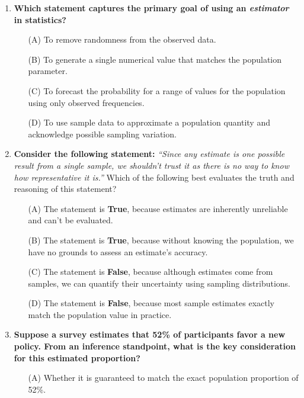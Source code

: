 \documentclass{article}
\begin{document}
\begin{enumerate}
    \item \textbf{Which statement captures the primary goal of using an \emph{estimator} in statistics?}
        \begin{enumerate}
        \item[(A)] To remove randomness from the observed data.
        \item[(B)] To generate a single numerical value that matches the population parameter.
        \item[(C)] To forecast the probability for a range of values for the population using only observed frequencies.
        \item[(D)] To use sample data to approximate a population quantity and acknowledge possible sampling variation.
        \end{enumerate}
    \item \textbf{Consider the following statement:} \newline 
        \emph{``Since any estimate is one possible result from a single sample, we shouldn’t trust it as there is no way to know how representative it is.”} \newline 
        Which of the following best evaluates the truth and reasoning of this statement?
        \begin{enumerate}
        \item[(A)] The statement is \textbf{True}, because estimates are inherently unreliable and can’t be evaluated.
        \item[(B)] The statement is \textbf{True}, because without knowing the population, we have no grounds to assess an estimate’s accuracy.
        \item[(C)] The statement is \textbf{False}, because although estimates come from samples, we can quantify their uncertainty using sampling distributions.
        \item[(D)] The statement is \textbf{False}, because most sample estimates exactly match the population value in practice.
        \end{enumerate}
    \item \textbf{Suppose a survey estimates that 52\% of participants favor a new policy. From an inference standpoint, what is the key consideration for this estimated proportion?}
        \begin{enumerate}
        \item[(A)] Whether it is guaranteed to match the exact population proportion of 52\%.

\end{enumerate}
\end{enumerate}
\end{document}
